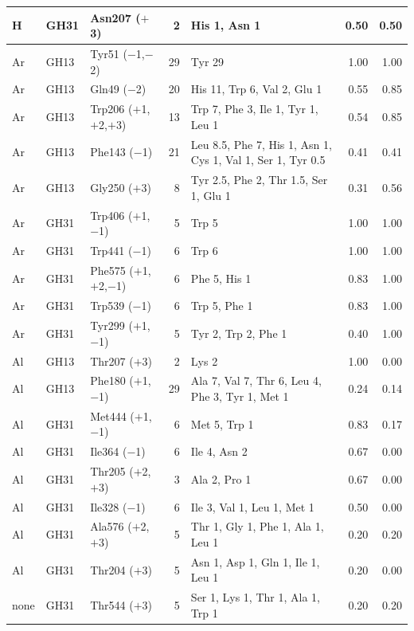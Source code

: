 \documentclass[preprint,12pt]{elsarticle}
\begin{document}
\begin{table}[p]
\begin{tabular}{lllrp{4.6cm}rr}
H & GH31 & Asn207 ($+$3) & 2 & His 1, Asn 1 & 0.50 & 0.50\\
\midrule
Ar & GH13 & Tyr51 ($-$1,$-$2) & 29 & Tyr 29 & 1.00 & 1.00\\
Ar & GH13 & Gln49 ($-$2) & 20 & His 11, Trp 6, Val 2, Glu 1 & 0.55 & 0.85\\
Ar & GH13 & Trp206 ($+$1,$+$2,$+$3) & 13 & Trp 7, Phe 3, Ile 1, Tyr 1, Leu 1 & 0.54 & 0.85\\
Ar & GH13 & Phe143 ($-$1) & 21 & Leu 8.5, Phe 7, His 1, Asn 1, Cys 1, Val 1, Ser 1, Tyr 0.5 & 0.41 & 0.41\\
Ar & GH13 & Gly250 ($+$3) & 8 & Tyr 2.5, Phe 2, Thr 1.5, Ser 1, Glu 1 & 0.31 & 0.56\\
Ar & GH31 & Trp406 ($+$1,$-$1) & 5 & Trp 5 & 1.00 & 1.00\\
Ar & GH31 & Trp441 ($-$1) & 6 & Trp 6 & 1.00 & 1.00\\
Ar & GH31 & Phe575 ($+$1,$+$2,$-$1) & 6 & Phe 5, His 1 & 0.83 & 1.00\\
Ar & GH31 & Trp539 ($-$1) & 6 & Trp 5, Phe 1 & 0.83 & 1.00\\
Ar & GH31 & Tyr299 ($+$1,$-$1) & 5 & Tyr 2, Trp 2, Phe 1 & 0.40 & 1.00\\
\midrule
Al & GH13 & Thr207 ($+$3) & 2 & Lys 2 & 1.00 & 0.00\\
Al & GH13 & Phe180 ($+$1,$-$1) & 29 & Ala 7, Val 7, Thr 6, Leu 4, Phe 3, Tyr 1, Met 1 & 0.24 & 0.14\\
Al & GH31 & Met444 ($+$1,$-$1) & 6 & Met 5, Trp 1 & 0.83 & 0.17\\
Al & GH31 & Ile364 ($-$1) & 6 & Ile 4, Asn 2 & 0.67 & 0.00\\
Al & GH31 & Thr205 ($+$2,$+$3) & 3 & Ala 2, Pro 1 & 0.67 & 0.00\\
Al & GH31 & Ile328 ($-$1) & 6 & Ile 3, Val 1, Leu 1, Met 1 & 0.50 & 0.00\\
Al & GH31 & Ala576 ($+$2,$+$3) & 5 & Thr 1, Gly 1, Phe 1, Ala 1, Leu 1 & 0.20 & 0.20\\
Al & GH31 & Thr204 ($+$3) & 5 & Asn 1, Asp 1, Gln 1, Ile 1, Leu 1 & 0.20 & 0.00\\
\midrule
none & GH31 & Thr544 ($+$3) & 5 & Ser 1, Lys 1, Thr 1, Ala 1, Trp 1 & 0.20 & 0.20\\
\bottomrule
\end{tabular}
\end{table}
\end{document}
